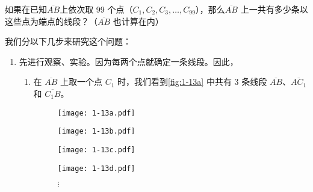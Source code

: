 \begin{example}\label{exp:segment_count}
如果在已知$\overline{AB}$上依次取 99 个点（$C_1,C_2,C_3,\ldots,C_{99}$），那么$\overline{AB}$ 上一共有多少条以这些点为端点的线段？（$\overline{AB}$ 也计算在内）
\end{example}	

\begin{solution}
我们分以下几步来研究这个问题：
\begin{enumerate}[leftmargin=2.0em,label=第\chinese*步,font=\bfseries]
	\item 先进行观察、实验。因为每两个点就确定一条线段。因此，
	\begin{enumerate}[leftmargin=0.0em,label=\arabic*)]
    \item 在 $\overline{AB}$ 上取一个点 $C_1$ 时，我们看到\cref{fig:1-13a} 中共有 3 条线段 $\overline{AB}$、$\overline{AC_1}$ 和 $\overline{C_1B}$。
    \begin{figure}
			\begin{minipage}[b]{0.7\linewidth}\centering
				\texttt{[image: 1-13a.pdf]}
			\end{minipage}%
			\begin{minipage}[b]{0.1\linewidth}
				\subcaption{}\label{fig:1-13a}
			\end{minipage}
			\begin{minipage}[b]{0.7\linewidth}\centering
				\texttt{[image: 1-13b.pdf]}
			\end{minipage}%
			\begin{minipage}[b]{0.1\linewidth}
				\subcaption{}\label{fig:1-13b}
			\end{minipage}
			\begin{minipage}[b]{0.7\linewidth}\centering
				\texttt{[image: 1-13c.pdf]}
			\end{minipage}%
			\begin{minipage}[b]{0.1\linewidth}
				\subcaption{}\label{fig:1-13c}
			\end{minipage}
			\begin{minipage}[b]{0.7\linewidth}\centering
				\texttt{[image: 1-13d.pdf]}
			\end{minipage}%
			\begin{minipage}[b]{0.1\linewidth}
				\subcaption{}\label{fig:1-13d}
			\end{minipage}
			\begin{minipage}[b]{0.7\linewidth}\centering
				$\vdots$
			\end{minipage}%
			\begin{minipage}[b]{0.1\linewidth}\centering

\end{minipage}
\end{figure}
\end{enumerate}
\end{enumerate}
\end{solution}
